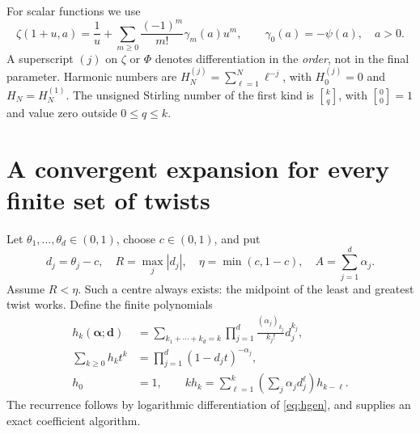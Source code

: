 \documentclass[11pt,a4paper]{article}
\numberwithin{equation}{section}
\theoremstyle{definition}\newtheorem{definition}[theorem]{Definition}
\theoremstyle{remark}\newtheorem{remark}[theorem]{Remark}
\newcommand{\av}{\boldsymbol\alpha}\newcommand{\dv}{\boldsymbol d}
\newcommand{\stir}[2]{\genfrac{[}{]}{0pt}{}{#1}{#2}}
\begin{document}
For scalar functions we use
\begin{equation}
 \zeta(1+u,a)=\frac1u+
       \sum_{m\ge0}\frac{(-1)^m}{m!}\gamma_m(a)u^m,
 \qquad \gamma_0(a)=-\psi(a),\quad a>0.
 \label{eq:stieltjes}
\end{equation}
A superscript $(j)$ on $\zeta$ or $\Phi$ denotes differentiation in the
\emph{order}, not in the final parameter. Harmonic numbers are
$H_N^{(j)}=\sum_{\ell=1}^N\ell^{-j}$, with $H_0^{(j)}=0$ and
$H_N=H_N^{(1)}$. The unsigned Stirling number of the first kind is
$\stir{k}{q}$, with $\stir00=1$ and value zero outside $0\le q\le k$.

\section{A convergent expansion for every finite set of twists}
\label{sec:central}
Let $\theta_1,\ldots,\theta_d\in(0,1)$, choose $c\in(0,1)$, and put
\begin{equation}
 d_j=\theta_j-c,\quad R=\max_j|d_j|,\quad
 \eta=\min(c,1-c),\quad A=\sum_{j=1}^d\alpha_j.
 \label{eq:centraldata}
\end{equation}
Assume $R<\eta$. Such a centre always exists: the midpoint of the least
and greatest twist works. Define the finite polynomials
\begin{align}
 h_k(\av;\dv)
 &=\sum_{k_1+\cdots+k_d=k}\prod_{j=1}^d
       \frac{(\alpha_j)_{k_j}}{k_j!}d_j^{k_j},\label{eq:hk}\\
 \sum_{k\ge0}h_k t^k
 &=\prod_{j=1}^d(1-d_jt)^{-\alpha_j},\label{eq:hgen}\\
 h_0&=1,\qquad
 k h_k=\sum_{\ell=1}^k
       \left(\sum_j\alpha_jd_j^\ell\right)h_{k-\ell}.
 \label{eq:hrec}
\end{align}
The recurrence follows by logarithmic differentiation of
\eqref{eq:hgen}, and supplies an exact coefficient algorithm.
\end{document}
